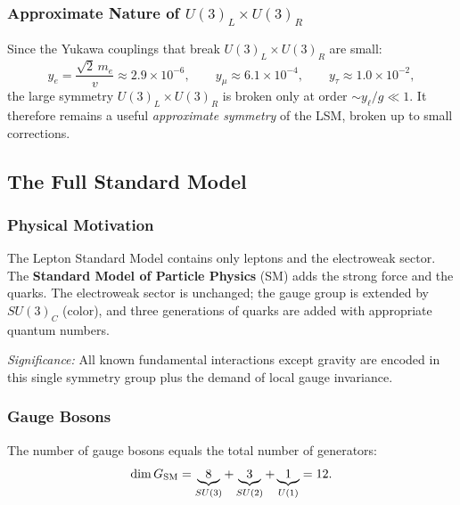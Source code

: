 \subsubsection*{Approximate Nature of $U(3)_L\times U(3)_R$}

Since the Yukawa couplings that break $U(3)_L\times U(3)_R$ are small:
\begin{equation}
  y_e = \frac{\sqrt2\,m_e}{v} \approx 2.9\times10^{-6},
  \qquad
  y_\mu \approx 6.1\times10^{-4},
  \qquad
  y_\tau \approx 1.0\times10^{-2},
  \label{eq:lec19:yukawa-magnitudes}
\end{equation}
the large symmetry $U(3)_L\times U(3)_R$ is broken only at order
$\sim y_\ell/g \ll 1$. It therefore remains a useful \emph{approximate
symmetry} of the LSM, broken up to small corrections.

\subsection{The Full Standard Model}\label{subsec:lec19:fullsm}

\subsubsection*{Physical Motivation}

The Lepton Standard Model contains only leptons and the electroweak
sector. The \textbf{Standard Model of Particle Physics} (SM) adds
the strong force and the quarks. The electroweak sector is unchanged;
the gauge group is extended by $SU(3)_C$ (color), and three
generations of quarks are added with appropriate quantum numbers.


\textit{Significance:} All known fundamental interactions except
gravity are encoded in this single symmetry group plus the demand of
local gauge invariance.

\subsubsection*{Gauge Bosons}

The number of gauge bosons equals the total number of generators:
\begin{equation}
  \dim G_{\rm SM} = \underbrace{8}_{SU(3)} + \underbrace{3}_{SU(2)}
                  + \underbrace{1}_{U(1)} = 12.
  \label{eq:lec19:sm-dim}
\end{equation}

